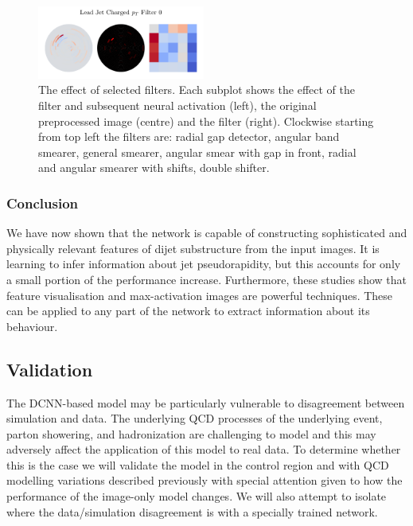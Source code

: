 \begin{figure}[h!]
\begin{center}
        \includegraphics[width=0.49\textwidth]{figures/event_selection/ggh_firstconv_0_0.pdf}
    \end{center}
    \caption{The effect of selected filters. Each subplot shows the effect of the filter and subsequent neural activation (left), the original preprocessed image (centre) and the filter (right).
             Clockwise starting from top left the filters are: radial gap detector, angular band smearer, general smearer, angular smear with gap in front, radial and angular smearer with shifts, double shifter.}
    \label{fig:event_categorisation:filter_action}
\end{figure}



\subsubsection{Conclusion}
We have now shown that the network is capable of constructing sophisticated and physically relevant features of dijet substructure from the input images. 
It is learning to infer information about jet pseudorapidity, but this accounts for only a small portion of the performance increase. 
Furthermore, these studies show that feature visualisation and max-activation images are powerful techniques. 
These can be applied to any part of the network to extract information about its behaviour.  











\subsection{Validation}
The DCNN-based model may be particularly vulnerable to disagreement between simulation and data. The underlying QCD processes of the underlying event, parton showering, and hadronization are challenging to model and this may adversely affect the application of this model to real data. To determine whether this is the case we will validate the model in the \Zee control region and with QCD modelling variations described previously with special attention given to how the performance of the image-only model changes.
We will also attempt to isolate where the \Zee data/simulation disagreement is with a specially trained network. 

